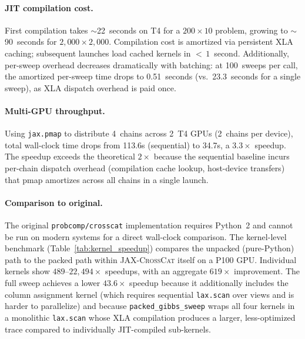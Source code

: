 \documentclass[11pt]{article}
\newcommand{\jaxcc}{\textsc{JAX-CrossCat}}
\begin{document}
\paragraph{JIT compilation cost.} First compilation takes
${\sim}$22~seconds on T4 for a $200 \times 10$ problem, growing to
${\sim}$90~seconds for $2{,}000 \times 2{,}000$.
Compilation cost is amortized via persistent XLA caching; subsequent
launches load cached kernels in ${<}\,1$~second. Additionally,
per-sweep overhead decreases dramatically with batching: at 100~sweeps
per call, the amortized per-sweep time drops to 0.51~seconds (vs.\
23.3~seconds for a single sweep), as XLA dispatch overhead is paid once.

\paragraph{Multi-GPU throughput.} Using \texttt{jax.pmap} to distribute
4~chains across 2~T4 GPUs (2~chains per device), total wall-clock time
drops from 113.6s (sequential) to 34.7s, a $3.3\times$ speedup. The
speedup exceeds the theoretical $2\times$ because the sequential baseline
incurs per-chain dispatch overhead (compilation cache lookup, host-device
transfers) that pmap amortizes across all chains in a single launch.

\paragraph{Comparison to original.} The original
\texttt{probcomp/crosscat} implementation requires Python~2 and cannot be
run on modern systems for a direct wall-clock comparison. The kernel-level
benchmark (Table~\ref{tab:kernel_speedup}) compares the unpacked
(pure-Python) path to the packed path within \jaxcc{} itself on a P100
GPU. Individual kernels show $489$--$22{,}494\times$ speedups, with an
aggregate $619\times$ improvement. The full sweep achieves a lower
$43.6\times$ speedup because it additionally includes the column
assignment kernel (which requires sequential \texttt{lax.scan} over views
and is harder to parallelize) and because \texttt{packed\_gibbs\_sweep}
wraps all four kernels in a monolithic \texttt{lax.scan} whose XLA
compilation produces a larger, less-optimized trace compared to
individually JIT-compiled sub-kernels.
\end{document}
